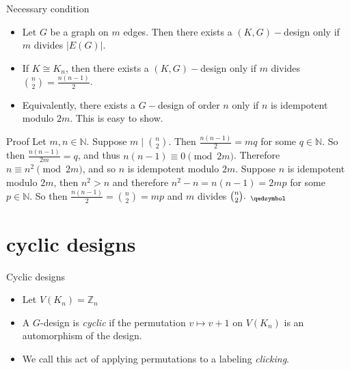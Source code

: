 \documentclass{beamer}
\theoremstyle{plain}
\begin{document}
\begin{frame}{Necessary condition}
\begin{itemize}
\item Let $G$ be a graph on $m$ edges. Then there exists a $(K,G)-$design only if $m$ divides $|E(G)|$.
\pause
\item If $K\cong K_{n}$, then there exists a $(K,G)-$design only if $m$ divides $\binom{n}{2}=\frac{n(n-1)}{2}$.
\pause
\item Equivalently, there exists a $G-$design of order $n$ only if $n$ is idempotent modulo $2m$.  This is easy to show.
\pause
\end{itemize}

\begin{block}{Proof}
    Let $m,n\in \mathbb{N}$. Suppose $m \mid \binom{n}{2}$. Then $\frac{n(n-1)}{2} = mq$ for some $q \in \mathbb{N}$. So then $\frac{n(n-1)}{2m} = q$, and thus $n(n-1) \equiv 0 \pmod{2m}$. Therefore $n \equiv n^2 \pmod{2m}$, and so $n$ is idempotent modulo $2m$. Suppose $n$ is idempotent modulo $2m$, then $n^{2}>n$ and therefore $n^{2}-n=n(n-1)=2mp$ for some $p\in \mathbb{N}$. So then $\frac{n(n-1)}{2}=\binom{n}{2}=mp$ and $m$ divides $\binom{n}{2}._{\;\;\qedsymbol}$ 
    \end{block}
\end{frame}
\section{cyclic designs}
\begin{frame}{Cyclic designs}
    \pause
    \begin{itemize}
    \item Let $V(K_n)=\mathbb{Z}_n$
    \pause
    \item A $G$-design is \emph{cyclic} if the permutation $v\mapsto v+1$ on $V(K_n)$ is an automorphism of the design.
    \pause
    \item We call this act of applying permutations to a labeling \emph{clicking}.
    \end{itemize}
    \end{frame}
\end{document}
